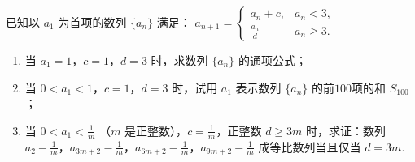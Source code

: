 \begin{problem}
已知以 \(a_{1}\) 为首项的数列 \(\{a_{n}\}\) 满足： \(a_{n+1} = \begin{cases}
a_{n} + c, & a_{n} < 3,\\
\frac{a_{n}}{d} & a_{n} \geqslant 3.
\end{cases}\)
\begin{enumerate}
\item 当 \(a_{1} = 1\)，\(c = 1\)，\(d = 3\) 时，求数列 \(\{a_{n}\}\) 的通项公式；
\item 当 \(0 < a_{1} < 1\)，\(c = 1\)，\(d = 3\) 时，试用 \(a_{1}\) 表示数列 \(\{a_{n}\}\) 的前\(100\)项的和 \(S_{100}\)；
\item 当 \(0 < a_{1} < \frac{1}{m}\) （\(m\) 是正整数），\(c = \frac{1}{m}\)，正整数 \(d \geqslant 3m\) 时，求证：数列 \(a_{2} - \frac{1}{m}\)，\(a_{3m+2} - \frac{1}{m}\)，\(a_{6m+2} - \frac{1}{m}\)，\(a_{9m+2} - \frac{1}{m}\) 成等比数列当且仅当 \(d = 3m\).
\end{enumerate}
\end{problem}

